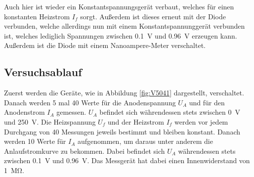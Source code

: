 \documentclass[
  bibliography=totoc,     %
  captions=tableheading,  %
  titlepage=firstiscover, %
]{scrartcl}
\begin{document}
\noindent
Auch hier ist wieder ein Konstantspannungsgerät verbaut, welches für einen konstanten Heizstrom $I_f$ sorgt. Außerdem ist dieses erneut mit der Diode verbunden, welche allerdings nun mit einem Konstantspannunggerät verbunden ist, welches lediglich Spannungen zwischen \SI{0.1}{\volt} und \SI{0.96}{\volt} erzeugen kann. Außerdem ist die Diode mit einem Nanoampere-Meter verschaltet.
\subsection{Versuchsablauf}
\label{sec:ablauf}
Zuerst werden die Geräte, wie in Abbildung \ref{fig:V5041} dargestellt, verschaltet. Danach werden 5 mal 40 Werte für die Anodenspannung $U_A$ und für den Anodenstrom $I_A$ gemessen. $U_A$ befindet sich währendessen stets zwischen \SI{0}{\volt} und \SI{250}{\volt}. Die Heizspannung $U_f$ und der Heizstrom $I_f$ werden vor jedem Durchgang von 40 Messungen jeweils bestimmt und bleiben konstant. Danach werden 10 Werte für $I_A$ aufgenommen, um daraus unter anderem die Anlaufstromkurve zu bekommen. Dabei befindet sich $U_A$ währendessen stets zwischen \SI{0.1}{\volt} und \SI{0.96}{\volt}. Das Messgerät hat dabei einen Innenwiderstand von \SI{1}{\mega\ohm}.
\end{document}

